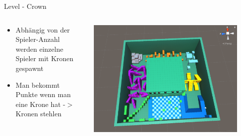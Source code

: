 \documentclass[xcolor=dvipsnames]{beamer}
\begin{document}
\begin{frame}{Level - Crown}
\begin{columns}
\begin{column}{0.5\textwidth}
	\begin{itemize}
		\item Abhängig von der Spieler-Anzahl werden einzelne Spieler mit Kronen gespawnt 
		\item Man bekommt Punkte wenn man eine Krone hat -$>$ Kronen stehlen
	\end{itemize}
\end{column}
\begin{column}{0.5\textwidth} 
	\begin{center}
		\includegraphics[width=0.9\textwidth]{level_crown.png}
	\end{center}
\end{column}
\end{columns}

\end{frame}
\end{document}
